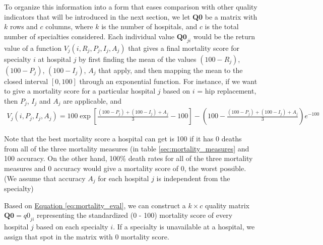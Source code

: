 \documentclass{article}
\begin{document}
To organize this information into a form that eases comparison with other quality indicators that will be introduced in the next section, we let \textbf{Q0} be a matrix with $k$ rows and $c$ columns, where $k$ is the number of hospitals, and $c$ is the total number of specialties considered. Each individual value $\mathbf{Q0}_{ji}$ would be the return value of a function $V_j\left(i,R_j, P_j, I_j, A_j\right)$ that gives a final mortality score for specialty $i$ at hospital $j$ by first finding the mean of the values $(100-R_j)$, $(100-P_j)$, $(100-I_j)$, $A_j$ that apply, and then mapping the mean to the closed interval $[0,100]$ through an exponential function. For instance, if we want to give a mortality score for a particular hospital $j$ based on $i$ = hip replacement, then $P_j$, $I_j$ and $A_j$ are applicable, and
\begin{gather}\label{eq:mortality_eval}
    V_j\left(i, P_j, I_j, A_j\right) = 100\exp\left[\frac{(100-P_j) + (100-I_j) + A_j}{3} - 100\right] - \left(100 - \frac{(100-P_j) + (100-I_j) + A_j}{3}\right) e^{-100}
\end{gather}

Note that the best mortality score a hospital can get is 100 if it has 0 deaths from all of the three mortality measures (in table \ref{sec:mortality_measures} and 100 accuracy. On the other hand, 100\% death rates for all of the three mortality measures and 0 accuracy would give a mortality score of 0, the worst possible. (We assume that accuracy $A_j$ for each hospital $j$ is independent from the specialty)

Based on \hyperref[eq:mortality_eval]{Equation \ref*{eq:mortality_eval}}, we can construct a $k \times c$ quality matrix $\mathbf{Q0} = \textit{q0}_{ji}$ representing the standardized (0 - 100) mortality score of every hospital $j$ based on each specialty $i$. If a specialty is unavailable at a hospital, we assign that spot in the matrix with 0 mortality score.
\end{document}
